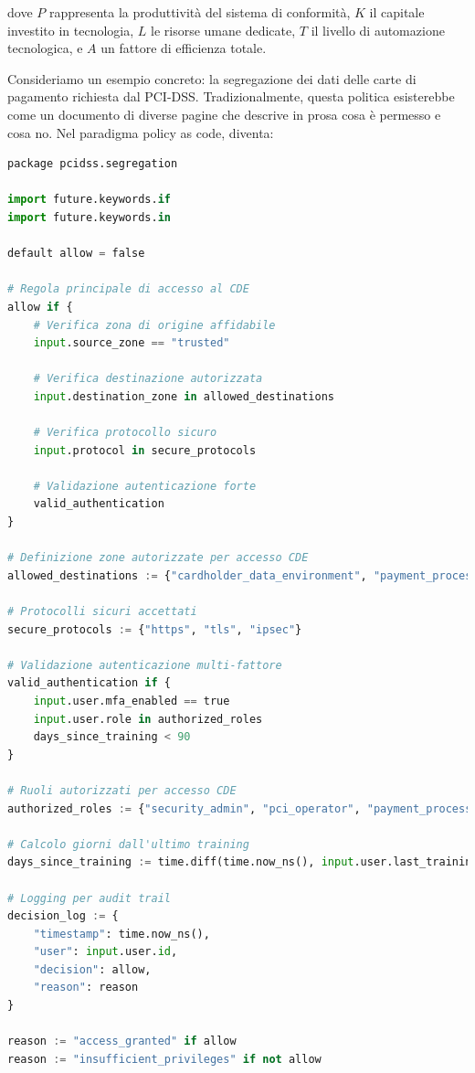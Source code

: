 dove $P$ rappresenta la produttività del sistema di conformità, $K$ il capitale investito in tecnologia, $L$ le risorse umane dedicate, $T$ il livello di automazione tecnologica, e $A$ un fattore di efficienza totale.

Consideriamo un esempio concreto: la segregazione dei dati delle carte di pagamento richiesta dal PCI-DSS. Tradizionalmente, questa politica esisterebbe come un documento di diverse pagine che descrive in prosa cosa è permesso e cosa no. Nel paradigma policy as code, diventa:

\begin{lstlisting}[language=Python, caption=Implementazione Policy as Code per segregazione PCI-DSS]
package pcidss.segregation

import future.keywords.if
import future.keywords.in

default allow = false

# Regola principale di accesso al CDE
allow if {
    # Verifica zona di origine affidabile
    input.source_zone == "trusted"
    
    # Verifica destinazione autorizzata
    input.destination_zone in allowed_destinations
    
    # Verifica protocollo sicuro
    input.protocol in secure_protocols
    
    # Validazione autenticazione forte
    valid_authentication
}

# Definizione zone autorizzate per accesso CDE
allowed_destinations := {"cardholder_data_environment", "payment_processing"}

# Protocolli sicuri accettati
secure_protocols := {"https", "tls", "ipsec"}

# Validazione autenticazione multi-fattore
valid_authentication if {
    input.user.mfa_enabled == true
    input.user.role in authorized_roles
    days_since_training < 90
}

# Ruoli autorizzati per accesso CDE
authorized_roles := {"security_admin", "pci_operator", "payment_processor"}

# Calcolo giorni dall'ultimo training
days_since_training := time.diff(time.now_ns(), input.user.last_training_ns) / (24 * 60 * 60 * 1000000000)

# Logging per audit trail
decision_log := {
    "timestamp": time.now_ns(),
    "user": input.user.id,
    "decision": allow,
    "reason": reason
}

reason := "access_granted" if allow
reason := "insufficient_privileges" if not allow
\end{lstlisting}

